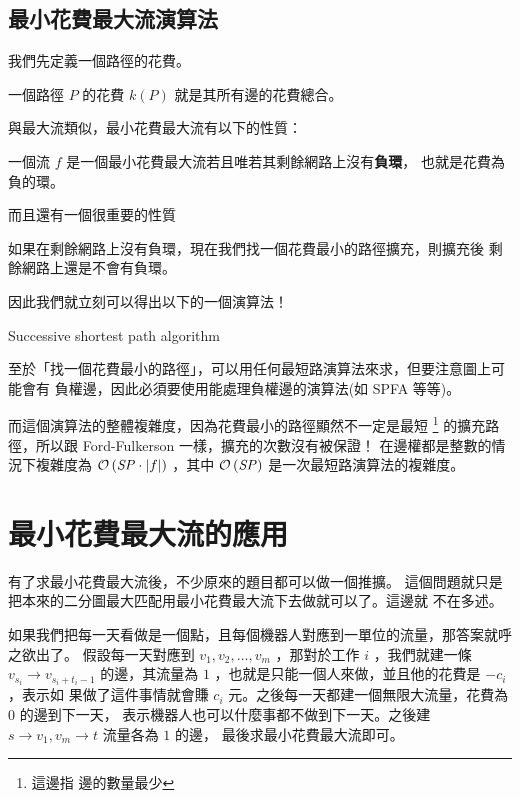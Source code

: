 \documentclass[a4paper,12pt]{book}
\begin{document}
\subsection{最小花費最大流演算法}

我們先定義一個路徑的花費。
\begin{theorem}[定義]
  一個路徑 $P$ 的花費 $k(P)$ 就是其所有邊的花費總合。
\end{theorem}
與最大流類似，最小花費最大流有以下的性質：
\begin{theorem}[定理]
  一個流 $f$ 是一個最小花費最大流若且唯若其剩餘網路上沒有{\bf 負環}，
  也就是花費為負的環。
\end{theorem}
而且還有一個很重要的性質
\begin{theorem}[定理]
  如果在剩餘網路上沒有負環，現在我們找一個花費最小的路徑擴充，則擴充後
  剩餘網路上還是不會有負環。
\end{theorem}
因此我們就立刻可以得出以下的一個演算法！\\
\begin{algorithm}[H]
  \DontPrintSemicolon
  \caption{Successive shortest path algorithm}\label{euclid}
  \myalg{\FF{}} {
}
\end{algorithm}
至於「找一個花費最小的路徑」，可以用任何最短路演算法來求，但要注意圖上可能會有
負權邊，因此必須要使用能處理負權邊的演算法(如 SPFA 等等)。

而這個演算法的整體複雜度，因為花費最小的路徑顯然不一定是最短 \footnote{這邊指
  邊的數量最少} 的擴充路徑，所以跟 Ford-Fulkerson 一樣，擴充的次數沒有被保證！
在邊權都是整數的情況下複雜度為 $\operatorname{\mathcal{O}}\left(\mathit{SP} \cdot \lvert f \rvert\right)$ ，其中
$\operatorname{\mathcal{O}}\left(\mathit{SP}\right)$ 是一次最短路演算法的複雜度。

\section{最小花費最大流的應用}
有了求最小花費最大流後，不少原來的題目都可以做一個推擴。
這個問題就只是把本來的二分圖最大匹配用最小花費最大流下去做就可以了。這邊就
不在多述。

如果我們把每一天看做是一個點，且每個機器人對應到一單位的流量，那答案就呼之欲出了。
假設每一天對應到 $v_1, v_2, \dots, v_m$ ，那對於工作 $i$ ，我們就建一條 $v_{s_i} \rightarrow 
v_{s_i+t_i-1}$ 的邊，其流量為 $1$ ，也就是只能一個人來做，並且他的花費是 $-c_i$，表示如
果做了這件事情就會賺 $c_i$ 元。之後每一天都建一個無限大流量，花費為 $0$ 的邊到下一天，
表示機器人也可以什麼事都不做到下一天。之後建 $s \rightarrow v_1, v_{m} \rightarrow t$ 
流量各為 $1$ 的邊， 最後求最小花費最大流即可。
\end{document}
